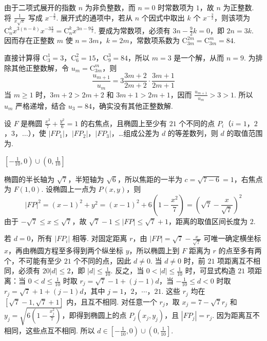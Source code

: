 \begin{solution}
由于二项式展开的指数 \(n\) 为非负整数，而 \(n=0\) 时常数项为 \(1\)，故 \(n\) 为正整数. 将 \(\frac{1}{x\sqrt{x}}\) 写成 \(x^{-\frac{3}{2}}\). 展开式的通项中，若从 \(n\) 个因式中取出 \(k\) 个 \(x^{-\frac{3}{2}}\)，则该项为 \(\mathrm C_n^k x^{3(n-k)}x^{-3\frac{k}{2}}=\mathrm C_n^k x^{3n-9\frac{k}{2}}\). 要成为常数项，必须有 \(3n-\frac{9}{2}k=0\)，即 \(2n=3k\). 因而存在正整数 \(m\) 使 \(n=3m\)，\(k=2m\)，常数项系数为 \(\mathrm C_{3m}^{2m}=\mathrm C_{3m}^{m}=84\).

直接计算得 \(\mathrm C_3^1=3\)，\(\mathrm C_6^2=15\)，\(\mathrm C_9^3=84\)，所以 \(m=3\) 是一个解，从而 \(n=9\). 为排除其他正整数解，令 \(u_m=\mathrm C_{3m}^{m}\)，则
\[
\frac{u_{m+1}}{u_m}
=3\frac{3m+2}{2m+2}\cdot\frac{3m+1}{2m+1}
\]
当 \(m\geqslant1\) 时，\(3m+2>2m+2\) 和 \(3m+1>2m+1\)，因而 \(\frac{u_{m+1}}{u_m}>3>1\). 所以 \(u_m\) 严格递增，结合 \(u_3=84\)，确实没有其他正整数解.
\end{solution}

\begin{problem}
设 \(F\) 是椭圆 \(\frac{x^2}{7}+\frac{y^2}{6}=1\) 的右焦点，且椭圆上至少有 \(21\) 个不同的点 \(P_i\)（\(i=1\)，\(2\)，\(3\)，\(\dots\)），使 \(\left|FP_1\right|\)，\(\left|FP_2\right|\)，\(\left|FP_3\right|\)，\ldots 组成公差为 \(d\) 的等差数列，则 \(d\) 的取值范围为\fillinblank{}.
\end{problem}

\begin{answer}
\(\left[-\frac{1}{10},0\right)\cup\left(0,\frac{1}{10}\right]\)
\end{answer}

\begin{solution}
椭圆的半长轴为 \(\sqrt{7}\)，半短轴为 \(\sqrt{6}\)，所以焦距的一半为 \(c=\sqrt{7-6}=1\)，右焦点为 \(F(1,0)\). 设椭圆上一点为 \(P(x,y)\)，则
\[
|FP|^2=(x-1)^2+y^2=(x-1)^2+6\left(1-\frac{x^2}{7}\right)=\left(\sqrt{7}-\frac{x}{\sqrt{7}}\right)^2
\]
由于 \(-\sqrt{7}\leqslant x\leqslant\sqrt{7}\)，故 \(\sqrt{7}-1\leqslant|FP|\leqslant\sqrt{7}+1\)，距离的取值区间长度为 \(2\).

若 \(d=0\)，所有 \(|FP_i|\) 相等. 对固定距离 \(r\)，由 \(|FP|=\sqrt{7}-\frac{x}{\sqrt{7}}\) 可唯一确定横坐标 \(x\)，再由椭圆方程至多得到两个纵坐标 \(y\)，所以椭圆上到 \(F\) 距离为 \(r\) 的点至多有两个，不可能有至少 \(21\) 个不同的点，因此 \(d\neq0\). 当 \(d\neq0\) 时，前 \(21\) 项距离互不相同，必须有 \(20|d|\leqslant2\)，即 \(|d|\leqslant\frac{1}{10}\). 反之，当 \(0<|d|\leqslant\frac{1}{10}\) 时，可显式构造 \(21\) 项距离：当 \(0<d\leqslant\frac{1}{10}\) 时取 \(r_j=\sqrt{7}-1+(j-1)d\)，当 \(-\frac{1}{10}\leqslant d<0\) 时取 \(r_j=\sqrt{7}+1+(j-1)d\)，其中 \(j=1\)，\(2\)，\(\cdots\)，\(21\). 这些 \(r_j\) 均在 \(\left[\sqrt{7}-1,\sqrt{7}+1\right]\) 内，且互不相同. 对任意一个 \(r_j\)，取 \(x_j=7-\sqrt{7}r_j\) 和 \(y_j=\sqrt{6\left(1-\frac{x_j^2}{7}\right)}\)，即得到椭圆上的点 \(P_j(x_j,y_j)\)，且 \(|FP_j|=r_j\). 因为距离互不相同，这些点互不相同. 所以 \(d\in\left[-\frac{1}{10},0\right)\cup\left(0,\frac{1}{10}\right]\).
\end{solution}


